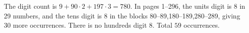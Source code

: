 The digit count is $9+90\cdot2+197\cdot3=\boxed{780}$. In pages 1--296, the units digit is 8 in 29 numbers, and the tens digit is 8 in the blocks 80--89,180--189,280--289, giving 30 more occurrences. There is no hundreds digit 8. Total $\boxed{59}$ occurrences.
